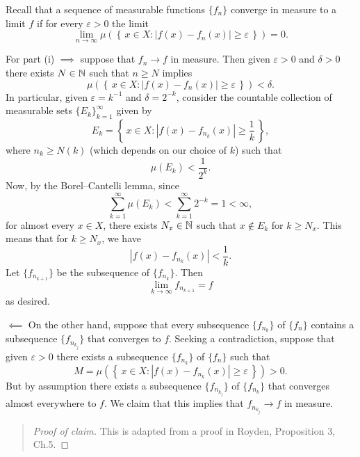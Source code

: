 \begin{solution}
  Recall that a sequence of measurable functions $\{f_n\}$ converge in
  measure to a limit $f$ if for every $\varepsilon>0$ the limit
  \[
    \lim_{n\to\infty}
    \mu\left(\left\{\,x\in X:|f(x)-f_n(x)|\geq\varepsilon\,\right\}\right)=0.
  \]

  For part (i) $\implies$ suppose that $f_n\to f$ in measure. Then given
  $\varepsilon>0$ and $\delta>0$ there exists $N\in\mathbb{N}$ such that $n\geq
  N$ implies
  \[
    \mu\left(\left\{\,%
        x\in X:|f(x)-f_n(x)|\geq\varepsilon%
        \,\right\}\right)%
    <\delta.
  \]
  In particular, given $\varepsilon=k^{-1}$ and $\delta=2^{-k}$, consider
  the countable collection of measurable sets ${\{E_k\}}_{k=1}^\infty$
  given by
  \[
    E_k=\left\{\,x\in X:|f(x)-f_{n_k}(x)|\geq\frac{1}{k}\,\right\},
  \]
  where $n_k\geq N(k)$ (which depends on our choice of $k$) such that
  \[
    \mu(E_k)<\frac{1}{2^k}.
  \]
  Now, by the Borel--Cantelli lemma, since
  \[
    \sum_{k=1}^\infty \mu(E_k)<\sum_{k=1}^\infty 2^{-k}=1<\infty,
  \]
  for almost every $x\in X$, there exists $N_x\in\mathbb{N}$ such that $x\notin
  E_k$ for $k\geq N_x$. This means that for $k\geq N_x$, we have
  \[
    |f(x)-f_{n_k}(x)|<\frac{1}{k}.
  \]
  Let $\{f_{n_{k+1}}\}$ be the subsequence of $\{f_{n_k}\}$. Then
  \[
    \lim_{k\to\infty} f_{n_{k+1}}=f
  \]
  as desired.

  $\impliedby$ On the other hand, suppose that every subsequence
  $\{f_{n_k}\}$ of $\{f_n\}$ contains a subsequence $\{f_{n_{k_j}}\}$ that
  converges to $f$. Seeking a contradiction, suppose that given
  $\varepsilon>0$ there exists a subsequence $\{f_{n_k}\}$ of $\{f_n\}$
  such that
  \[
    M=\mu\left(\left\{\,x\in
        X:|f(x)-f_{n_k}(x)|\geq\varepsilon\,\right\}\right)>0.
  \]
  But by assumption there exists a subsequence $\{f_{n_{k_j}}\}$ of
  $\{f_{n_k}\}$ that converges almost everywhere to $f$. We claim that this
  implies that $f_{n_{k_j}}\to f$ in measure.
  \begin{quote}
  \begin{proof}[Proof of claim]
    This is adapted from a proof in Royden, Proposition 3, Ch.\@ 5.


\end{proof}
\end{quote}
\end{solution}
